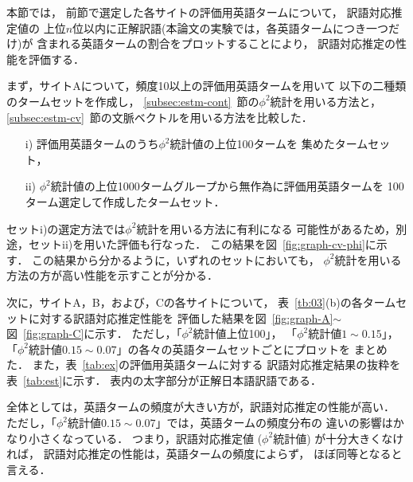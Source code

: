 本節では，
前節で選定した各サイトの評価用英語タームについて，
訳語対応推定値の
上位$n$位以内に正解訳語(本論文の実験では，各英語タームにつき一つだけ)が
含まれる英語タームの割合をプロットすることにより，
訳語対応推定の性能を評価する．

まず，サイトAについて，頻度10以上の評価用英語タームを用いて
以下の二種類のタームセットを作成し，
\ref{subsec:estm-cont}~節の$\phi^2$統計を用いる方法と，
\ref{subsec:estm-cv}~節の文脈ベクトルを用いる方法を比較した．
\begin{enumerate}
\item[i)] 評価用英語タームのうち$\phi^2$統計値の上位100タームを
   集めたタームセット，
\item[ii)] $\phi^2$統計値の上位1000タームグループから無作為に評価用英語タームを
      100ターム選定して作成したタームセット．
\end{enumerate} 
セットi)の選定方法では$\phi^2$統計を用いる方法に有利になる
可能性があるため，別途，セットii)を用いた評価も行なった．
この結果を図~\ref{fig:graph-cv-phi}に示す．
この結果から分かるように，いずれのセットにおいても，
$\phi^2$統計を用いる方法の方が高い性能を示すことが分かる．

次に，サイトA，B，および，Cの各サイトについて，
表~\ref{tb:03}(b)の各タームセットに対する訳語対応推定性能を
評価した結果を図~\ref{fig:graph-A}$\sim$図~\ref{fig:graph-C}に示す．
ただし，「$\phi^2$統計値上位100」，
「$\phi^2統計値 1\sim0.15$」，
「$\phi^2統計値 0.15\sim0.07$」の各々の英語タームセットごとにプロットを
まとめた．
また，表~\ref{tab:ex}の評価用英語タームに対する
訳語対応推定結果の抜粋を表~\ref{tab:est}に示す．
表内の太字部分が正解日本語訳語である．

全体としては，英語タームの頻度が大きい方が，訳語対応推定の性能が高い．
ただし，「$\phi^2統計値 0.15\sim0.07$」では，英語タームの頻度分布の
違いの影響はかなり小さくなっている．
つまり，訳語対応推定値
($\phi^2統計値$)
が十分大きくなければ，
訳語対応推定の性能は，英語タームの頻度によらず，
ほぼ同等となると言える．


